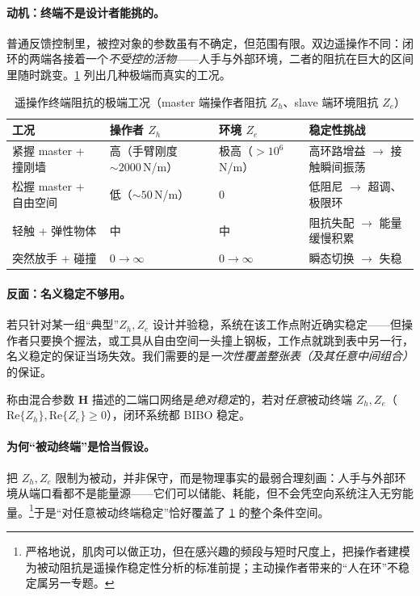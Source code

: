 \paragraph{动机：终端不是设计者能挑的。}
普通反馈控制里，被控对象的参数虽有不确定，但范围有限。双边遥操作不同：闭环的两端各接着一个\emph{不受控的活物}——人手与外部环境，二者的阻抗在巨大的区间里随时跳变。\cref{tab:ts-scenarios} 列出几种极端而真实的工况。

\begin{table}[H]\centering\small
\caption{遥操作终端阻抗的极端工况（master 端操作者阻抗 $Z_h$、slave 端环境阻抗 $Z_e$）}
\label{tab:ts-scenarios}
\begin{tabular}{lllp{4.4cm}}
\toprule
工况 & 操作者 $Z_h$ & 环境 $Z_e$ & 稳定性挑战 \\
\midrule
紧握 master + 撞刚墙 & 高（手臂刚度 $\sim 2000\,$N/m） & 极高（$>10^6\,$N/m） & 高环路增益 $\to$ 接触瞬间振荡 \\
松握 master + 自由空间 & 低（$\sim 50\,$N/m） & $0$ & 低阻尼 $\to$ 超调、极限环 \\
轻触 + 弹性物体 & 中 & 中 & 阻抗失配 $\to$ 能量缓慢积累 \\
突然放手 + 碰撞 & $0\to\infty$ & $0\to\infty$ & 瞬态切换 $\to$ 失稳 \\
\bottomrule
\end{tabular}
\end{table}

\paragraph{反面：名义稳定不够用。}
若只针对某一组“典型”$Z_h,Z_e$ 设计并验稳，系统在该工作点附近确实稳定——但操作者只要换个握法，或工具从自由空间一头撞上钢板，工作点就跳到表中另一行，名义稳定的保证当场失效。我们需要的是\emph{一次性覆盖整张表（及其任意中间组合）}的保证。

\begin{definition}[绝对稳定]\label{def:ts-abs-stable}
称由混合参数 $\mathbf H$ 描述的二端口网络是\emph{绝对稳定}的，若对\emph{任意}被动终端 $Z_h,Z_e$（$\mathrm{Re}\{Z_h\},\mathrm{Re}\{Z_e\}\ge0$），闭环系统都 BIBO 稳定。
\end{definition}

\paragraph{为何“被动终端”是恰当假设。}
把 $Z_h,Z_e$ 限制为被动，并非保守，而是物理事实的最弱合理刻画：人手与外部环境从端口看都不是能量源——它们可以储能、耗能，但不会凭空向系统注入无穷能量。\footnote{严格地说，肌肉可以做正功，但在感兴趣的频段与短时尺度上，把操作者建模为被动阻抗是遥操作稳定性分析的标准前提；主动操作者带来的“人在环”不稳定属另一专题。}于是“对任意被动终端稳定”恰好覆盖了 \cref{tab:ts-scenarios} 的整个条件空间。

